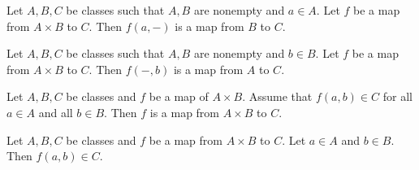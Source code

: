 \documentclass[../../set-theory/set-theory.tex]{subfiles}
\begin{document}
  \begin{forthel}
    \begin{proposition}
      Let $A, B, C$ be classes such that $A, B$ are nonempty and $a \in A$.
      Let $f$ be a map from $A \times B$ to $C$.
      Then $f(a,-)$ is a map from $B$ to $C$.
    \end{proposition}
  \end{forthel}

  \begin{forthel}
    \begin{proposition}
      Let $A, B, C$ be classes such that $A, B$ are nonempty and $b \in B$.
      Let $f$ be a map from $A \times B$ to $C$.
      Then $f(-,b)$ is a map from $A$ to $C$.
    \end{proposition}
  \end{forthel}

  \begin{forthel}
    \begin{proposition}
      Let $A, B, C$ be classes and $f$ be a map of $A \times B$.
      Assume that $f(a,b) \in C$ for all $a \in A$ and all $b \in B$.
      Then $f$ is a map from $A \times B$ to $C$.
    \end{proposition}
  \end{forthel}

  \begin{forthel}
    \begin{proposition}
      Let $A, B, C$ be classes and $f$ be a map from $A \times B$ to $C$.
      Let $a \in A$ and $b \in B$.
      Then $f(a,b) \in C$.
    \end{proposition}
  \end{forthel}
\end{document}
